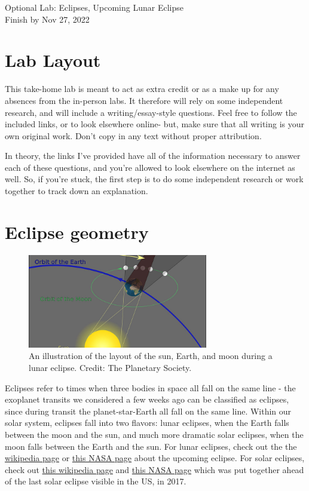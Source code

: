\documentclass[11pt]{article}
\begin{document}
\begin{center}
\huge{Optional Lab: Eclipses, Upcoming Lunar Eclipse}\\ \medskip \Large{Finish by Nov 27, 2022}
\end{center}

\section{Lab Layout}
This take-home lab is meant to act as extra credit or as a make up for any absences from the in-person labs. It therefore will rely on some independent research, and will include a writing/essay-style questions. Feel free to follow the included links, or to look elsewhere online- but, make sure that all writing is your own original work. Don't copy in any text without proper attribution.

In theory, the links I've provided have all of the information necessary to answer each of these questions, and you're allowed to look elsewhere on the internet as well. So, if you're stuck, the first step is to do some independent research or work together to track down an explanation. 

\section{Eclipse geometry}

\begin{figure}[!h]
    \centering
    \includegraphics[width=0.7\textwidth]{eclipse_geo.jpg}
    \caption{An illustration of the layout of the sun, Earth, and moon during a lunar eclipse. Credit: The Planetary Society.}
    \label{fig:geometry}
\end{figure}

Eclipses refer to times when three bodies in space all fall on the same line - the exoplanet transits we considered a few weeks ago can be classified as eclipses, since during transit the planet-star-Earth all fall on the same line. Within our solar system, eclipses fall into two flavors: lunar eclipses, when the Earth falls between the moon and the sun, and much more dramatic solar eclipses, when the moon falls between the Earth and the sun. For lunar eclipses, check out the the \href{https://en.wikipedia.org/wiki/Lunar_eclipse}{wikipedia page} or \href{https://moon.nasa.gov/news/185/what-you-need-to-know-about-the-lunar-eclipse/}{this NASA page} about the upcoming eclipse. For solar eclipses, check out \href{https://en.wikipedia.org/wiki/Solar_eclipse}{this wikipedia page} and \href{https://eclipse2017.nasa.gov/eclipse-101}{this NASA page} which was put together ahead of the last solar eclipse visible in the US, in 2017.
\end{document}
